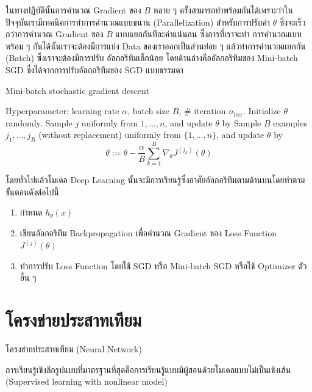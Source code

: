 ในทางปฏิบัตินั้นการคำนวณ Gradient ของ $B$ หลาย ๆ ครั้งสามารถทำพร้อมกันได้เพราะว่าในปัจจุบันเรามีเทคนิคการทำการคำนวณแบบขนาน 
(Parallelization) สำหรับการปรับค่า $\theta$ ซึ่งจะเร็วกว่าการคำนวณ Gradient ของ $B$ แบบแยกกันทีละค่าแน่นอน ซึ่งการที่เราจะทำ%
การคำนวณแบบพร้อม ๆ กันได้นั้นเราจะต้องมีการแบ่ง Data ของเราออกเป็นส่วนย่อย ๆ แล้วทำการคำนวณแยกกัน (Batch) ซึ่งเราจะต้องมีการปรับ%
อัลกอริทึมเล็กน้อย โดยด้านล่างคืออัลกอริทึมของ Mini-batch SGD ซึ่งได้จากการปรับอัลกอริทึมของ SGD แบบธรรมดา  

\begin{algorithm}[ht]
    \caption{Mini-batch stochastic gradient descent}
    \label{alg:sgd_minibatch}
    \begin{algorithmic}
    \State Hyperparameter: learning rate $\alpha$, batch size $B$, \# iteration $n_\text{iter}$.
    \State Initialize $\theta$ randomly.
        \State Sample $j$ uniformly from ${1,\ldots,n}$, and update $\theta$ by
        \State Sample $B$ examples $j_1,\ldots,j_B$ (without replacement) uniformly from $\{1,\ldots,n\}$, 
        and update $\theta$ by
        \begin{equation*}
            \theta := \theta - \frac{\alpha}{B}\sum_{k=1}^B\nabla_\theta J^{(j_k)}(\theta)
        \end{equation*}
    \EndFor
    \end{algorithmic}
\end{algorithm}

โดยทั่วไปแล้วโมเดล Deep Learning นั้นจะมีการเรียนรู้ซึ่งอาศัยอัลกอริทึมตามด้านบนโดยทำตามขั้นตอนดังต่อไปนี้

\begin{enumerate}
    \item กำหนด $h_\theta(x)$
    \item เขียนอัลกอริทึม Backpropagation เพื่อคำนวณ Gradient ของ Loss Function $J^{(j)}(\theta)$
    \item ทำการปรับ Loss Function โดยใช้ SGD หรือ Mini-batch SGD หรือใช้ Optimizer ตัวอื่น ๆ
\end{enumerate}

\section{โครงข่ายประสาทเทียม}
\label{sec:nn}

โครงข่ายประสาทเทียม (Neural Network)

การเรียนรู้เชิงลึกรูปแบบที่มาตรฐานที่สุดคือการเรียนรู้แบบมีผู้สอนด้วยโมเดลแบบไม่เป็นเชิงเส้น (Supervised learning with nonlinear model)

